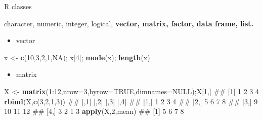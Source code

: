 \documentclass[ignorenonframetext,]{beamer}
\newenvironment{Shaded}{\begin{snugshade}}{\end{snugshade}}
\newcommand{\KeywordTok}[1]{\textcolor[rgb]{0.13,0.29,0.53}{\textbf{{#1}}}}
\newcommand{\DataTypeTok}[1]{\textcolor[rgb]{0.13,0.29,0.53}{{#1}}}
\newcommand{\DecValTok}[1]{\textcolor[rgb]{0.00,0.00,0.81}{{#1}}}
\newcommand{\StringTok}[1]{\textcolor[rgb]{0.31,0.60,0.02}{{#1}}}
\newcommand{\OtherTok}[1]{\textcolor[rgb]{0.56,0.35,0.01}{{#1}}}
\newcommand{\NormalTok}[1]{{#1}}
\begin{document}
\begin{frame}[fragile]{R classes}

character, numeric, integer, logical, \textbf{vector, matrix, factor,
data frame, list.}

\begin{itemize}
\itemsep1pt\parskip0pt
\item
  vector
\end{itemize}

\begin{Shaded}
\begin{Highlighting}[]
\NormalTok{x <-}\StringTok{ }\KeywordTok{c}\NormalTok{(}\DecValTok{10}\NormalTok{,}\DecValTok{3}\NormalTok{,}\DecValTok{2}\NormalTok{,}\DecValTok{1}\NormalTok{,}\OtherTok{NA}\NormalTok{); x[}\DecValTok{4}\NormalTok{]; }\KeywordTok{mode}\NormalTok{(x); }\KeywordTok{length}\NormalTok{(x) }
\end{Highlighting}
\end{Shaded}

\begin{itemize}
\itemsep1pt\parskip0pt
\item
  matrix
\end{itemize}

\begin{Shaded}
\begin{Highlighting}[]
\NormalTok{X <-}\StringTok{ }\KeywordTok{matrix}\NormalTok{(}\DecValTok{1}\NormalTok{:}\DecValTok{12}\NormalTok{,}\DataTypeTok{nrow=}\DecValTok{3}\NormalTok{,}\DataTypeTok{byrow=}\OtherTok{TRUE}\NormalTok{,}\DataTypeTok{dimnames=}\OtherTok{NULL}\NormalTok{);X[}\DecValTok{1}\NormalTok{,]}
\NormalTok{## [1] 1 2 3 4}
\KeywordTok{rbind}\NormalTok{(X,}\KeywordTok{c}\NormalTok{(}\DecValTok{3}\NormalTok{,}\DecValTok{2}\NormalTok{,}\DecValTok{1}\NormalTok{,}\DecValTok{3}\NormalTok{))}
\NormalTok{##      [,1] [,2] [,3] [,4]}
\NormalTok{## [1,]    1    2    3    4}
\NormalTok{## [2,]    5    6    7    8}
\NormalTok{## [3,]    9   10   11   12}
\NormalTok{## [4,]    3    2    1    3}
\KeywordTok{apply}\NormalTok{(X,}\DecValTok{2}\NormalTok{,mean)}
\NormalTok{## [1] 5 6 7 8}
\end{Highlighting}
\end{Shaded}

\end{frame}
\end{document}
